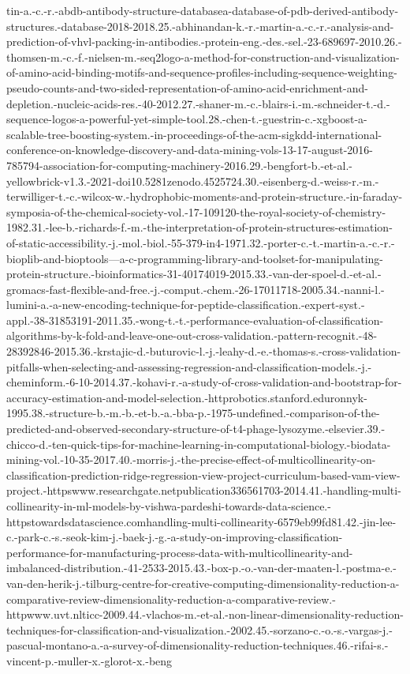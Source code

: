 \documentclass[
]{article}
\begin{document}
{{{tin-a.-c.-r.-abdb-antibody-structure-databasea-database-of-pdb-derived-antibody-structures.-database-2018-2018.25.-abhinandan-k.-r.-martin-a.-c.-r.-analysis-and-prediction-of-vhvl-packing-in-antibodies.-protein-eng.-des.-sel.-23-689697-2010.26.-thomsen-m.-c.-f.-nielsen-m.-seq2logo-a-method-for-construction-and-visualization-of-amino-acid-binding-motifs-and-sequence-profiles-including-sequence-weighting-pseudo-counts-and-two-sided-representation-of-amino-acid-enrichment-and-depletion.-nucleic-acids-res.-40-2012.27.-shaner-m.-c.-blairs-i.-m.-schneider-t.-d.-sequence-logos-a-powerful-yet-simple-tool.28.-chen-t.-guestrin-c.-xgboost-a-scalable-tree-boosting-system.-in-proceedings-of-the-acm-sigkdd-international-conference-on-knowledge-discovery-and-data-mining-vols-13-17-august-2016-785794-association-for-computing-machinery-2016.29.-bengfort-b.-et-al.-yellowbrick-v1.3.-2021-doi10.5281zenodo.4525724.30.-eisenberg-d.-weiss-r.-m.-terwilliger-t.-c.-wilcox-w.-hydrophobic-moments-and-protein-structure.-in-faraday-symposia-of-the-chemical-society-vol.-17-109120-the-royal-society-of-chemistry-1982.31.-lee-b.-richards-f.-m.-the-interpretation-of-protein-structures-estimation-of-static-accessibility.-j.-mol.-biol.-55-379-in4-1971.32.-porter-c.-t.-martin-a.-c.-r.-bioplib-and-bioptools---a-c-programming-library-and-toolset-for-manipulating-protein-structure.-bioinformatics-31-40174019-2015.33.-van-der-spoel-d.-et-al.-gromacs-fast-flexible-and-free.-j.-comput.-chem.-26-17011718-2005.34.-nanni-l.-lumini-a.-a-new-encoding-technique-for-peptide-classification.-expert-syst.-appl.-38-31853191-2011.35.-wong-t.-t.-performance-evaluation-of-classification-algorithms-by-k-fold-and-leave-one-out-cross-validation.-pattern-recognit.-48-28392846-2015.36.-krstajic-d.-buturovic-l.-j.-leahy-d.-e.-thomas-s.-cross-validation-pitfalls-when-selecting-and-assessing-regression-and-classification-models.-j.-cheminform.-6-10-2014.37.-kohavi-r.-a-study-of-cross-validation-and-bootstrap-for-accuracy-estimation-and-model-selection.-httprobotics.stanford.eduronnyk-1995.38.-structure-b.-m.-b.-et-b.-a.-bba-p.-1975-undefined.-comparison-of-the-predicted-and-observed-secondary-structure-of-t4-phage-lysozyme.-elsevier.39.-chicco-d.-ten-quick-tips-for-machine-learning-in-computational-biology.-biodata-mining-vol.-10-35-2017.40.-morris-j.-the-precise-effect-of-multicollinearity-on-classification-prediction-ridge-regression-view-project-curriculum-based-vam-view-project.-httpswww.researchgate.netpublication336561703-2014.41.-handling-multi-collinearity-in-ml-models-by-vishwa-pardeshi-towards-data-science.-httpstowardsdatascience.comhandling-multi-collinearity-6579eb99fd81.42.-jin-lee-c.-park-c.-s.-seok-kim-j.-baek-j.-g.-a-study-on-improving-classification-performance-for-manufacturing-process-data-with-multicollinearity-and-imbalanced-distribution.-41-2533-2015.43.-box-p.-o.-van-der-maaten-l.-postma-e.-van-den-herik-j.-tilburg-centre-for-creative-computing-dimensionality-reduction-a-comparative-review-dimensionality-reduction-a-comparative-review.-httpwww.uvt.nlticc-2009.44.-vlachos-m.-et-al.-non-linear-dimensionality-reduction-techniques-for-classification-and-visualization.-2002.45.-sorzano-c.-o.-s.-vargas-j.-pascual-montano-a.-a-survey-of-dimensionality-reduction-techniques.46.-rifai-s.-vincent-p.-muller-x.-glorot-x.-beng}}}
\end{document}
